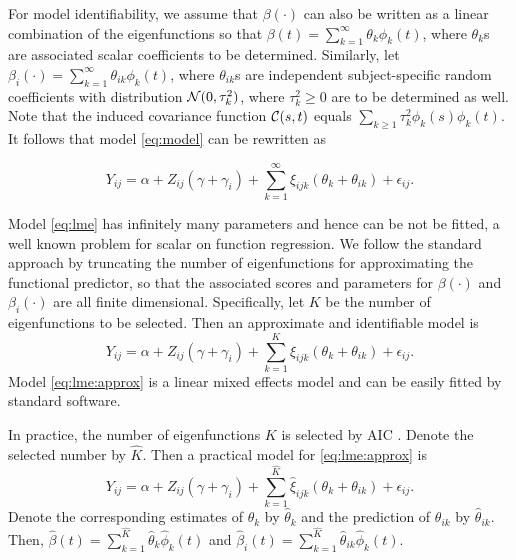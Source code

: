 For model identifiability, we assume that $\beta(\cdot)$ can also be written as a linear combination of the eigenfunctions
so that $\beta(t) = \sum_{k=1}^{\infty} \theta_k \phi_k(t)$, where $\theta_k$s are associated scalar coefficients to be determined.
Similarly, let $\beta_i(\cdot) = \sum_{k=1}^{\infty} \theta_{ik}\phi_k(t)$, where $\theta_{ik}$s are independent subject-specific
random coefficients with distribution $\mathcal{N}(0,\tau_k^2)$, where $\tau_k^2\geq 0$ are to be determined as well.
Note that the induced covariance function $\mathcal{C}(s,t)$ equals $\sum_{k\geq 1} \tau_k^2 \phi_k(s)\phi_k(t)$.
It follows that model \eqref{eq:model} can be rewritten as

\begin{equation}
\label{eq:lme}
Y_{ij} = \alpha + Z_{ij}(\gamma + \gamma_i)  + \sum_{k=1}^{\infty} \xi_{ijk} (\theta_{k} + \theta_{ik}) + \epsilon_{ij}.
\end{equation}

Model \eqref{eq:lme} has infinitely many parameters and hence can be not be fitted, a well known problem for scalar on
function regression. We follow the standard approach by truncating the number of eigenfunctions for approximating
the functional predictor, so that the associated scores and parameters for $\beta(\cdot)$ and $\beta_i(\cdot)$ are all finite dimensional.
Specifically, %
let $K$ be the number of eigenfunctions to be selected.
 Then an approximate and identifiable model is
\begin{equation}
\label{eq:lme:approx}
Y_{ij} = \alpha + Z_{ij}(\gamma + \gamma_i)  + \sum_{k=1}^{K} {\xi}_{ijk} (\theta_{k} + \theta_{ik}) + \epsilon_{ij}.
\end{equation}
Model \eqref{eq:lme:approx} is a linear mixed effects model and can be easily fitted by standard software.

In practice, the number of eigenfunctions $K$ is selected by AIC \cite{yao2005functional}.
Denote the selected number by $\hat{K}$. Then a practical model for \eqref{eq:lme:approx}
is
\begin{equation}
\label{eq:lme:prac}
Y_{ij} = \alpha + Z_{ij}(\gamma + \gamma_i)  + \sum_{k=1}^{\hat{K}} \hat{\xi}_{ijk} (\theta_{k} + \theta_{ik}) + \epsilon_{ij}.
\end{equation}
Denote the corresponding estimates of $\theta_k$ by $\hat{\theta}_k$ and the prediction of $\theta_{ik}$ by $\hat{\theta}_{ik}$.
Then,  $\hat{\beta}(t) = \sum_{k=1}^{\hat{K}} \hat{\theta}_k\hat{\phi}_k(t)$
and $\hat{\beta}_i(t) = \sum_{k=1}^{\hat{K}} \hat{\theta}_{ik}\hat{\phi}_k(t)$.

